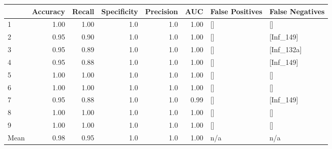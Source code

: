 \begin{tabular}{lrrrrrll}
\toprule
{} &  Accuracy &  Recall &  Specificity &  Precision &   AUC & False Positives & False Negatives \\
\midrule
1    &      1.00 &    1.00 &          1.0 &        1.0 &  1.00 &              [] &              [] \\
2    &      0.95 &    0.90 &          1.0 &        1.0 &  1.00 &              [] &       [Inf\_149] \\
3    &      0.95 &    0.89 &          1.0 &        1.0 &  1.00 &              [] &      [Inf\_132a] \\
4    &      0.95 &    0.88 &          1.0 &        1.0 &  1.00 &              [] &       [Inf\_149] \\
5    &      1.00 &    1.00 &          1.0 &        1.0 &  1.00 &              [] &              [] \\
6    &      1.00 &    1.00 &          1.0 &        1.0 &  1.00 &              [] &              [] \\
7    &      0.95 &    0.88 &          1.0 &        1.0 &  0.99 &              [] &       [Inf\_149] \\
8    &      1.00 &    1.00 &          1.0 &        1.0 &  1.00 &              [] &              [] \\
9    &      1.00 &    1.00 &          1.0 &        1.0 &  1.00 &              [] &              [] \\
Mean &      0.98 &    0.95 &          1.0 &        1.0 &  1.00 &             n/a &             n/a \\
\bottomrule
\end{tabular}
